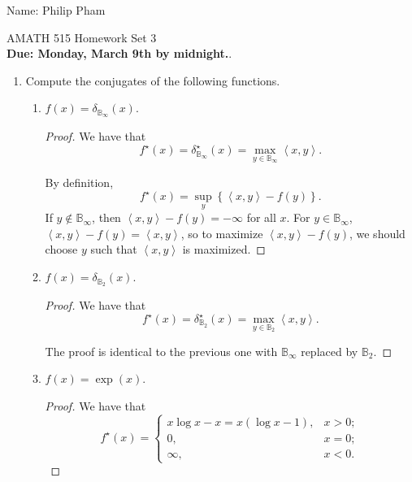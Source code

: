 \documentclass[11pt]{amsart}
\begin{document}
{\Large Name: Philip Pham}  \\
\begin{center}
\Large AMATH 515 \hskip 2in Homework Set 3\\
{\bf Due: Monday, March 9th by midnight.}. 
\end{center}
\bigskip
\begin{enumerate}

\item  Compute the conjugates of the following functions.  
\begin{enumerate}
\item $f(x) = \delta_{\mathbb{B}_{\infty}}(x)$.
  \begin{proof}
    We have that
    \begin{equation*}
      \boxed{
        f^\star(x) =
        \delta^\star_{\mathbb{B}_{\infty}}(x)
        = \max_{y \in \mathbb{B}_{\infty}} \left\langle x, y \right\rangle.}
    \end{equation*}

    By definition,
    \begin{equation*}
      f^\star(x) = \sup_{y}\left\{\left\langle x, y \right\rangle - f(y)\right\}.           
    \end{equation*}
    If $y \not\in \mathbb{B}_{\infty}$, then
    $\left\langle x, y \right\rangle - f(y) = -\infty$ for all $x$. For
    $y \in \mathbb{B}_{\infty}$,
    $\left\langle x, y \right\rangle - f(y) = \left\langle x, y \right\rangle$,
    so to maximize $\left\langle x, y \right\rangle - f(y)$, we should choose
    $y$ such that $\left\langle x, y \right\rangle$ is maximized.
  \end{proof}
\item $f(x) = \delta_{\mathbb{B}_{2}}(x)$.
  \begin{proof}
    We have that
    \begin{equation*}
      \boxed{
        f^\star(x) =
        \delta^\star_{\mathbb{B}_{2}}(x)
        = \max_{y \in \mathbb{B}_{2}} \left\langle x, y \right\rangle.}
    \end{equation*}
    
    The proof is identical to the previous one with $\mathbb{B}_{\infty}$
    replaced by $\mathbb{B}_2$.
  \end{proof}
\item $f(x) = \exp(x)$.
  \begin{proof}
    We have that
    \begin{equation*}
      \boxed{f^\star(x) =
        \begin{cases}
          x\log x - x = x\left(\log x - 1\right), &x > 0; \\
          0, &x = 0; \\
          \infty, &x < 0.
        \end{cases}}
    \end{equation*}


\end{proof}
\end{enumerate}
\end{enumerate}
\end{document}
